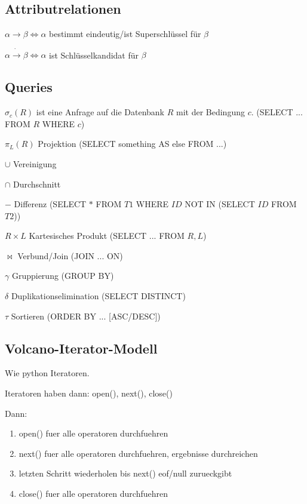 \documentclass[10pt,a4paper,oneside]{report}
\begin{document}
\subsection*{Attributrelationen}

$\alpha \rightarrow \beta \Leftrightarrow \alpha$ bestimmt eindeutig/ist Superschlüssel für $\beta$

$\alpha \dot{\rightarrow} \beta \Leftrightarrow \alpha$ ist Schlüsselkandidat für $\beta$

\subsection*{Queries}

$\sigma_c(R)$ ist eine Anfrage auf die Datenbank $R$ mit der Bedingung $c$. (SELECT ... FROM $R$ WHERE $c$)

$\pi_L(R)$ Projektion (SELECT something AS else FROM ...)

$\cup$ Vereinigung

$\cap$ Durchschnitt

$-$ Differenz (SELECT $*$ FROM $T1$ WHERE $ID$ NOT IN (SELECT $ID$ FROM $T2$))

$R \times L$ Kartesisches Produkt (SELECT ... FROM $R, L$)

$\bowtie$ Verbund/Join (JOIN ... ON)

$\gamma$ Gruppierung (GROUP BY)

$\delta$ Duplikationselimination (SELECT DISTINCT)

$\tau$ Sortieren (ORDER BY ... [ASC/DESC])

\subsection*{Volcano-Iterator-Modell}

Wie python Iteratoren.

Iteratoren haben dann: open(), next(), close()

Dann:

\begin{enumerate}
\item open() fuer alle operatoren durchfuehren
\item next() fuer alle operatoren durchfuehren, ergebnisse durchreichen
\item letzten Schritt wiederholen bis next() eof/null zurueckgibt
\item close() fuer alle operatoren durchfuehren
\end{enumerate}
\end{document}
